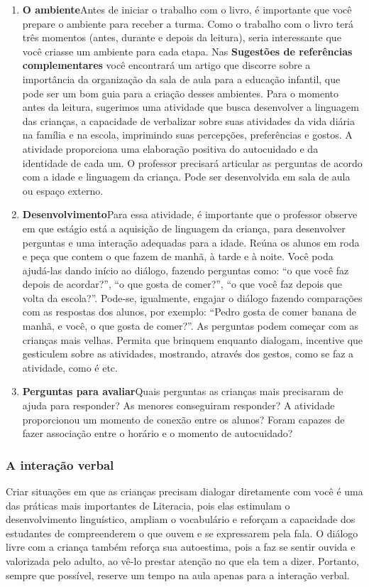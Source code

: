 \documentclass[11pt]{extarticle}
\begin{document}
\begin{enumerate}
\item \textbf{O ambiente}\quad Antes de iniciar o trabalho com o livro, é importante que você 
prepare o ambiente para receber a turma. Como o trabalho com o livro terá 
três momentos (antes, durante e depois da leitura), seria interessante que você 
criasse um ambiente para cada etapa. Nas \textbf{Sugestões de referências complementares} 
você encontrará um artigo que discorre sobre a importância da organização da sala 
de aula para a educação infantil, que pode ser um bom guia para a criação desses 
ambientes.
Para o momento antes da leitura, sugerimos uma atividade que busca desenvolver a linguagem das crianças, a capacidade de verbalizar sobre suas atividades da vida diária na família e na escola, imprimindo suas percepções, preferências e gostos. A atividade proporciona uma elaboração positiva do autocuidado e da identidade de cada um. O professor precisará articular as perguntas de acordo com a idade e linguagem da criança. 
Pode ser desenvolvida em sala de aula ou espaço externo. 

\item \textbf{Desenvolvimento}\quad Para essa atividade, é importante que o professor observe em que estágio está a aquisição de linguagem da criança, para desenvolver perguntas e uma interação adequadas para a idade. Reúna os alunos em roda e peça que contem o que fazem de manhã, à tarde e à noite. Você poda ajudá-las dando início ao diálogo, fazendo perguntas como: ``o que você faz depois de acordar?'', ``o que gosta de comer?'', ``o que você faz depois que volta da escola?''. Pode-se, igualmente, engajar o diálogo fazendo comparações com as respostas dos alunos, por exemplo: ``Pedro gosta de comer banana de manhã, e você, o que gosta de comer?''. As perguntas podem começar com as crianças mais velhas. Permita que brinquem enquanto dialogam, incentive que gesticulem sobre as atividades, mostrando, através dos gestos, como se faz a atividade, como é etc. 

\item \textbf{Perguntas para avaliar}\quad Quais perguntas as crianças mais precisaram de ajuda para responder? As menores conseguiram responder? A atividade proporcionou um momento de conexão entre os alunos? Foram capazes de fazer associação entre o horário e o momento de autocuidado? 

\end{enumerate}


\subsubsection{A interação verbal} 
Criar situações em que as crianças precisam dialogar diretamente com 
você é uma das práticas mais importantes de Literacia, pois elas estimulam 
o desenvolvimento linguístico, ampliam o vocabulário e reforçam a 
capacidade dos estudantes de compreenderem o que ouvem e se expressarem 
pela fala. O diálogo livre com a criança também reforça sua autoestima, pois 
a faz se sentir ouvida e valorizada pelo adulto, ao vê-lo prestar atenção 
no que ela tem a dizer. Portanto, sempre que possível, reserve um tempo na 
aula apenas para a interação verbal. 
\end{document}
